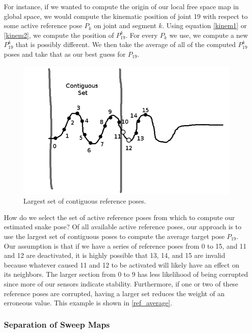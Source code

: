 For instance, if we wanted to compute the origin of our local free space map in global space, we would compute the kinematic position of joint 19 with respect to some active reference pose $P_k$ on joint and segment $k$. Using equation \autoref{kinem1} or \autoref{kinem2}, we compute the position of $P^{k}_{19}$. For every $P_k$ we use, we compute a new $P^{k}_{19}$ that is possibly different. We then take the average of all of the computed $P^{k}_{19}$ poses and take that as our best guess for $P_{19}$. 

\begin{figure}[htbp]
\centering
\includegraphics[keepaspectratio,width=400pt,height=0.75\textheight]{4_ref_averaging.png}
\caption{Largest set of contiguous reference poses.}
\label{ref_average}
\end{figure}



How do we select the set of active reference poses from which to compute our estimated snake pose? Of all available active reference poses, our approach is to use the largest set of contiguous poses to compute the average target pose $P_{19}$. Our assumption is that if we have a series of reference poses from 0 to 15, and 11 and 12 are deactivated, it is highly possible that 13, 14, and 15 are invalid because whatever caused 11 and 12 to be activated will likely have an effect on its neighbors. The larger section from 0 to 9 has less likelihood of being corrupted since more of our sensors indicate stability. Furthermore, if one or two of these reference poses are corrupted, having a larger set reduces the weight of an erroneous value. This example is shown in \autoref{ref_average}.

\subsubsection{Separation of Sweep Maps}
\label{separationofsweepmaps}

